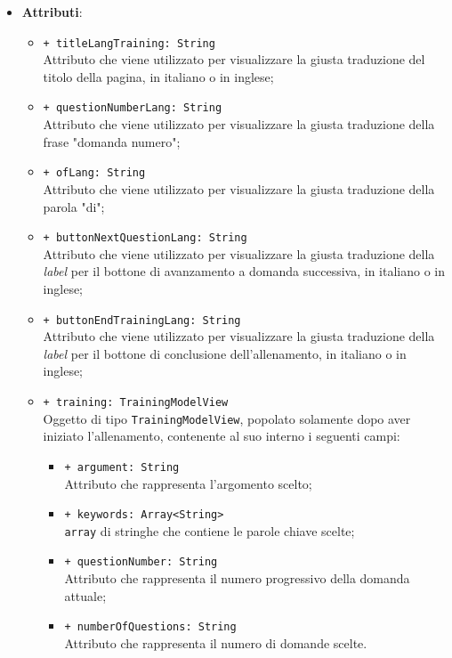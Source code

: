 \begin{itemize}
\begin{itemize}
	\end{itemize}
	\item \textbf{Attributi}:
	\begin{itemize}
		\item \texttt{+ titleLangTraining: String} \\ Attributo che viene utilizzato per visualizzare la giusta traduzione del titolo della pagina, in italiano o in inglese;
		\item \texttt{+ questionNumberLang: String} \\ Attributo che viene utilizzato per visualizzare la giusta traduzione della frase "domanda numero";
		\item \texttt{+ ofLang: String} \\ Attributo che viene utilizzato per visualizzare la giusta traduzione della parola "di";
		\item \texttt{+ buttonNextQuestionLang: String} \\ Attributo che viene utilizzato per visualizzare la giusta traduzione della \textit{label} per il bottone di avanzamento a domanda successiva, in italiano o in inglese;
		\item \texttt{+ buttonEndTrainingLang: String} \\ Attributo che viene utilizzato per visualizzare la giusta traduzione della \textit{label} per il bottone di conclusione dell'allenamento, in italiano o in inglese;
		\item \texttt{+ training: TrainingModelView} \\ Oggetto di tipo \texttt{TrainingModelView}, popolato solamente dopo aver iniziato l'allenamento, contenente al suo interno i seguenti campi:
		\begin{itemize}
			\item \texttt{+ argument: String} \\ Attributo che rappresenta l'argomento scelto;
			\item \texttt{+ keywords: Array<String>} \\ \texttt{array} di stringhe che contiene le parole chiave scelte;
			\item \texttt{+ questionNumber: String} \\ Attributo che rappresenta il numero progressivo della domanda attuale;
			\item \texttt{+ numberOfQuestions: String} \\ Attributo che rappresenta il numero di domande scelte.
		\end{itemize}
	\end{itemize}
\end{itemize}